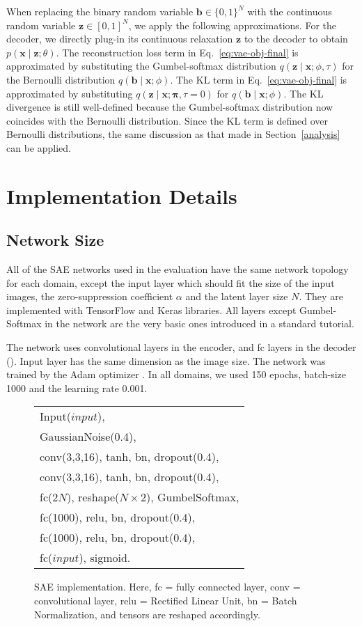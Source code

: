 \documentclass[10pt,letterpaper]{article}
\newcommand{\bx}{\mathbf{x}}
\newcommand{\bz}{\mathbf{z}}
\newcommand{\bb}{\mathbf{b}}
\begin{document}
When replacing the binary random variable $\mathbf{b}\in\{0,1\}^N$ with the continuous random variable $\mathbf{z}\in[0,1]^N$, we apply the following approximations.
For the decoder, we directly plug-in its continuous relaxation $\bz$ to the decoder to obtain $p(\bx \mid \bz;\theta)$.
The reconstruction loss term in Eq.~\eqref{eq:vae-obj-final} is approximated by substituting the Gumbel-softmax distribution $q(\bz \mid \bx;\phi,\tau)$ for the Bernoulli distribution $q(\bb \mid \bx;\phi)$.
The KL term in Eq.~\eqref{eq:vae-obj-final} is approximated by substituting $q(\bz \mid \bx;\bm{\pi},\tau=0)$ for $q(\bb \mid \bx;\phi)$.
The KL divergence is still well-defined because the Gumbel-softmax distribution now coincides with the Bernoulli distribution.
Since the KL term is defined over Bernoulli distributions, the same discussion as that made in Section~\ref{analysis} can be applied.


\section{Implementation Details}

\subsection{Network Size}
\label{network-implementation}
All of the SAE networks used in the evaluation have the same network
topology for each domain, except the input layer which should fit the size of the input
images, the zero-suppression coefficient $\alpha$ and the latent layer size $N$.
They are implemented with TensorFlow and Keras libraries.
All layers except Gumbel-Softmax in the network are the very basic ones introduced in a standard tutorial.

The network uses convolutional layers in the encoder, and fc layers
in the decoder ().
Input layer has the same dimension as the image size.
The network was trained by the Adam optimizer \cite{kingma2014adam}.
In all domains, we used 150 epochs, batch-size 1000 and the learning rate 0.001.

\begin{figure}[htb]
\centering
\begin{tabular}{|l|}
 Input($input$),\\
 GaussianNoise(0.4),\\
 conv(3,3,16), tanh, bn, dropout(0.4),\\
 conv(3,3,16), tanh, bn, dropout(0.4),\\
 fc(2$N$), reshape($N\times 2$), GumbelSoftmax,\\
 fc(1000), relu, bn, dropout(0.4),\\
 fc(1000), relu, bn, dropout(0.4),\\
 fc($input$), sigmoid.
\end{tabular}
\caption{SAE implementation.
 Here, fc = fully connected layer, conv = convolutional layer, 
relu = Rectified Linear Unit,
bn = Batch Normalization, %
and tensors are reshaped accordingly.}
\label{fig:sae-detail}
\end{figure}
\end{document}
